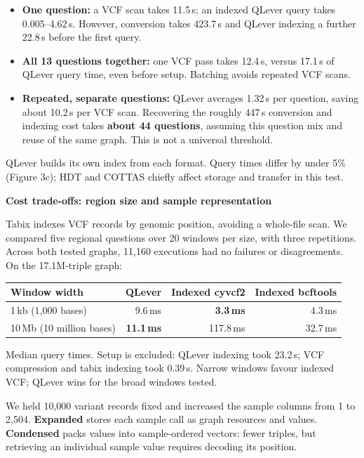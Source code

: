 \documentclass[11pt]{article}
\newcommand{\sub}[1]{\needspace{3\baselineskip}\vspace{3pt}{\bfseries #1}\par}
\newcommand{\figcaption}[1]{{\small\raggedright #1\par}}
\begin{document}
\sub{Read the speed-up together with its setup cost}
\begin{itemize}[itemsep=4pt]
\item \textbf{One question:} a VCF scan takes 11.5\,s; an indexed QLever query
takes 0.005--4.62\,s. However, conversion takes 423.7\,s and QLever indexing a
further 22.8\,s before the first query.
\item \textbf{All 13 questions together:} one VCF pass takes 12.4\,s, versus
17.1\,s of QLever query time, even before setup. Batching avoids repeated VCF scans.
\item \textbf{Repeated, separate questions:} QLever averages 1.32\,s per question,
saving about 10.2\,s per VCF scan. Recovering the roughly 447\,s conversion and
indexing cost takes \textbf{about 44 questions}, assuming this question mix and
reuse of the same graph. This is not a universal threshold.
\end{itemize}

QLever builds its own index from each format. Query times differ by under 5\%
(Figure 3c); HDT and COTTAS chiefly affect storage and transfer in this test.

\newpage
{\Large\bfseries Cost trade-offs: region size and sample representation}

\sub{Indexed VCF is a stronger baseline for regional lookups}
Tabix indexes VCF records by genomic position, avoiding a whole-file scan. We
compared five regional questions over 20 windows per size, with three repetitions.
Across both tested graphs, 11,160 executions had no failures or disagreements.
On the 17.1M-triple graph:

\begin{center}
\small
\begin{tabularx}{\textwidth}{@{}L r r r@{}}
\toprule
\textbf{Window width} & \textbf{QLever} & \textbf{Indexed cyvcf2} & \textbf{Indexed bcftools}\\
\,kb (1,000 bases) & 9.6\,ms & \textbf{3.3\,ms} & 4.3\,ms\\
10\,Mb (10 million bases) & \textbf{11.1\,ms} & 117.8\,ms & 32.7\,ms\\
\bottomrule
\end{tabularx}
\end{center}
\figcaption{Median query times. Setup is excluded: QLever indexing took 23.2\,s;
VCF compression and tabix indexing took 0.39\,s. Narrow windows favour indexed
VCF; QLever wins for the broad windows tested.}

\sub{Sample profiles change the amount of graph we need to build}
We held 10,000 variant records fixed and increased the sample columns from 1 to
2,504. \textbf{Expanded} stores each sample call as graph resources and values.
\textbf{Condensed} packs values into sample-ordered vectors: fewer triples, but
retrieving an individual sample value requires decoding its position.
\end{document}

